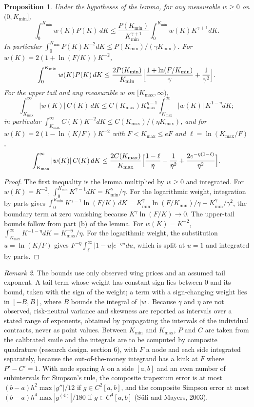 \documentclass[11pt]{article}
\newtheorem{proposition}{Proposition}
\theoremstyle{remark}
\newtheorem{remark}[proposition]{Remark}
\begin{document}
\begin{proposition}
Under the hypotheses of the lemma, for any measurable $w\ge0$ on $(0,K_{\min}]$,
\[
\int_0^{K_{\min}}w(K)P(K)\,dK\le\frac{P(K_{\min})}{K_{\min}^{\gamma+1}}\int_0^{K_{\min}}w(K)K^{\gamma+1}dK.
\]
In particular $\int_0^{K_{\min}}P(K)K^{-2}dK\le P(K_{\min})/(\gamma K_{\min})$. For $w(K)=2(1+\ln(F/K))K^{-2}$,
\[
\int_0^{K_{\min}}w(K)P(K)\,dK\le\frac{2P(K_{\min})}{K_{\min}}\Bigl[\frac{1+\ln(F/K_{\min})}{\gamma}+\frac{1}{\gamma^2}\Bigr].
\]
For the upper tail and any measurable $w$ on $[K_{\max},\infty)$,
\[
\int_{K_{\max}}^\infty|w(K)|\,C(K)\,dK\le C(K_{\max})K_{\max}^{\eta-1}\int_{K_{\max}}^\infty|w(K)|\,K^{1-\eta}dK;
\]
in particular $\int_{K_{\max}}^\infty C(K)K^{-2}dK\le C(K_{\max})/(\eta K_{\max})$, and for $w(K)=2(1-\ln(K/F))K^{-2}$ with $F<K_{\max}\le eF$ and $\ell=\ln(K_{\max}/F)$,
\[
\int_{K_{\max}}^\infty|w(K)|\,C(K)\,dK\le\frac{2C(K_{\max})}{K_{\max}}\Bigl[\frac{1-\ell}{\eta}-\frac{1}{\eta^2}+\frac{2e^{-\eta(1-\ell)}}{\eta^2}\Bigr].
\]
\end{proposition}

\begin{proof}
The first inequality is the lemma multiplied by $w\ge0$ and integrated. For $w(K)=K^{-2}$, $\int_0^{K_{\min}}K^{\gamma-1}dK=K_{\min}^\gamma/\gamma$. For the logarithmic weight, integration by parts gives $\int_0^{K_{\min}}K^{\gamma-1}\ln(F/K)\,dK=K_{\min}^\gamma\ln(F/K_{\min})/\gamma+K_{\min}^\gamma/\gamma^2$, the boundary term at zero vanishing because $K^\gamma\ln(F/K)\to0$. The upper-tail bounds follow from part (b) of the lemma. For $w(K)=K^{-2}$, $\int_{K_{\max}}^\infty K^{-1-\eta}dK=K_{\max}^{-\eta}/\eta$. For the logarithmic weight, the substitution $u=\ln(K/F)$ gives $F^{-\eta}\int_\ell^\infty|1-u|e^{-\eta u}du$, which is split at $u=1$ and integrated by parts.
\end{proof}

\begin{remark}
The bounds use only observed wing prices and an assumed tail exponent. A tail term whose weight has constant sign lies between $0$ and its bound, taken with the sign of the weight; a term with a sign-changing weight lies in $[-B,B]$, where $B$ bounds the integral of $|w|$. Because $\gamma$ and $\eta$ are not observed, risk-neutral variance and skewness are reported as intervals over a stated range of exponents, obtained by propagating the intervals of the individual contracts, never as point values. Between $K_{\min}$ and $K_{\max}$, $P$ and $C$ are taken from the calibrated smile and the integrals are to be computed by composite quadrature (research design, section 6), with $F$ a node and each side integrated separately, because the out-of-the-money integrand has a kink at $F$ where $P'-C'=1$. With node spacing $h$ on a side $[a,b]$ and an even number of subintervals for Simpson's rule, the composite trapezium error is at most $(b-a)h^2\max|g''|/12$ if $g\in C^2[a,b]$, and the composite Simpson error at most $(b-a)h^4\max|g^{(4)}|/180$ if $g\in C^4[a,b]$ (S\"uli and Mayers, 2003).
\end{remark}
\end{document}
